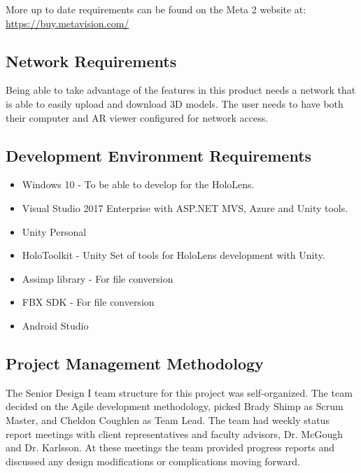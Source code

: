 More up to date requirements can be found on the Meta 2 website at: 
\url{https://buy.metavision.com/}

\subsection{Network Requirements}

Being able to take advantage of the features in this product needs a network
that is able to easily upload and download 3D models. The user needs to have
both their computer and AR viewer configured for network access.

\subsection{Development Environment Requirements}
\begin{itemize}
	\item Windows 10 - To be able to develop for the HoloLens.
	\item Visual Studio 2017 Enterprise with ASP.NET MVS, Azure and Unity tools.
	\item Unity Personal
	\item HoloToolkit - Unity Set of tools for HoloLens development with Unity.
	\item Assimp library - For file conversion
	\item FBX SDK - For file conversion
	\item Android Studio
\end{itemize}


\subsection{Project Management Methodology}

The Senior Design I team structure for this project was self-organized. The team decided on the Agile development methodology, picked Brady Shimp as Scrum Master, and Cheldon Coughlen as Team Lead. The team had weekly status report meetings with client representatives and faculty advisors, Dr. McGough and Dr. Karlsson. At these meetings the team provided progress reports and discussed any design modifications or complications moving forward.\\

